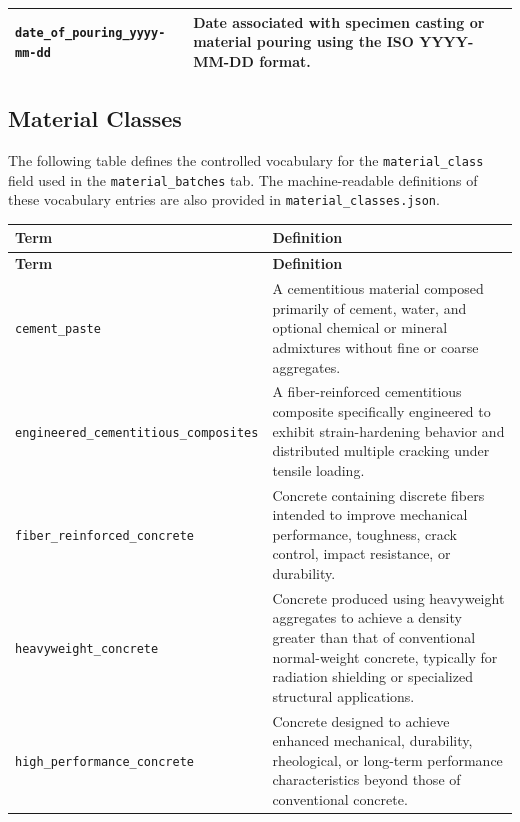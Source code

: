 \documentclass[11pt]{book}
\begin{document}
{\begin{longtable}{p{}p{}}
\texttt{date\_of\_pouring\_yyyy-mm-dd} &
Date associated with specimen casting or material pouring using the ISO YYYY-MM-DD format. \\

\hline
\end{longtable}


\subsection{Material Classes}
\label{vocab:material_class_list}

The following table defines the controlled vocabulary for the \texttt{material\_class} field used in the \texttt{material\_batches} tab. The machine-readable definitions of these vocabulary entries are also provided in  \texttt{material\_classes.json}.

\begin{longtable}{p{}p{}}
\hline
\textbf{Term} & \textbf{Definition} \\
\hline
\endfirsthead

\hline
\textbf{Term} & \textbf{Definition} \\
\hline
\endhead

\texttt{cement\_paste} &
A cementitious material composed primarily of cement, water, and optional chemical or mineral admixtures without fine or coarse aggregates. \\

\texttt{engineered\_cementitious\_composites} &
A fiber-reinforced cementitious composite specifically engineered to exhibit strain-hardening behavior and distributed multiple cracking under tensile loading. \\

\texttt{fiber\_reinforced\_concrete} &
Concrete containing discrete fibers intended to improve mechanical performance, toughness, crack control, impact resistance, or durability. \\

\texttt{heavyweight\_concrete} &
Concrete produced using heavyweight aggregates to achieve a density greater than that of conventional normal-weight concrete, typically for radiation shielding or specialized structural applications. \\

\texttt{high\_performance\_concrete} &
Concrete designed to achieve enhanced mechanical, durability, rheological, or long-term performance characteristics beyond those of conventional concrete. \\


\end{longtable}}
\end{document}
